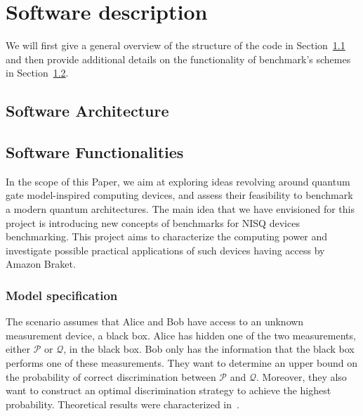 \documentclass[preprint,12pt, a4paper]{elsarticle}
\newcommand{\1}{{\rm 1\hspace{-0.9mm}l}}
\newcommand{\PP}{\mathcal{P}}
\begin{document}
\section{Software description}
\label{}

We will first give a general overview of the structure of the code in 
Section~\ref{sec:sortware-architecture} and then provide additional details on 
the functionality of benchmark's schemes  in 
Section~\ref{sec:sortware-functionalities}.

\subsection{Software Architecture}\label{sec:sortware-architecture}
\label{}


\subsection{Software Functionalities}\label{sec:sortware-functionalities}

In the scope of this Paper, we aim at  exploring ideas revolving around quantum 
gate model-inspired computing devices, and assess their feasibility to 
benchmark a modern quantum architectures. The main idea that we have envisioned 
for this project is  introducing new concepts of benchmarks for NISQ devices 
benchmarking. This project aims to characterize the computing power and 
investigate possible practical applications of such devices having access by 
Amazon Braket. 





\subsubsection{Model specification}
The scenario assumes that Alice and Bob have access to an unknown measurement
device, a black box. Alice has hidden one of the two measurements, either $\PP$
or $\mathcal{Q}$, in the black box. Bob only has the information that the black box
performs one of these measurements. They want to determine an upper bound on the
probability of correct discrimination between $\PP$ and $\mathcal{Q}$. Moreover, they also want to
construct an optimal discrimination strategy to achieve the highest probability. Theoretical results were characterized in~\cite{puchala2018strategies}.
\end{document}
